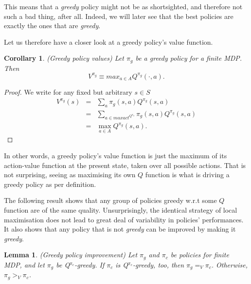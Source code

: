 \documentclass[11pt]{article} %
\newtheorem{lem}{Lemma}
\newtheorem{cor}{Corollary}
\begin{document}
This means that a \textit{greedy} policy might not be as shortsighted, and therefore not such a bad thing, after all. Indeed, we will later see that the best policies are exactly the ones that are \textit{greedy}.

Let us therefore have a closer look at a greedy policy's value function.

\begin{cor}{(Greedy policy values)}
	Let $\pi_g$ be a \textit{greedy} policy for a finite MDP. Then $$V^{\pi_g} \equiv max_{a \in A} Q^{\pi_g}(\cdot,a).$$
\end{cor}

\begin{proof}
	We write for any fixed but arbitrary $s \in S$
	\[
		\begin{array}{rll}
			V^{\pi_g}(s) 	& = 	& \sum_a \pi_g(s,a) Q^{\pi_g}(s,a) \\
						& =	& \sum_{a \in maxact^{Q^{\pi_g}}} \pi_g(s,a) Q^{\pi_g}(s,a) \\
						& = 	& \max_{a \in A} Q^{\pi_g}(s,a).
		\end{array}
	\]
\end{proof}

In other words, a greedy policy's value function is just the maximum of its action-value function at the present state, taken over all possible actions. That is not surprising, seeing as maximising its own $Q$ function is what is driving a greedy policy as per definition.

The following result shows that any group of policies greedy w.r.t some $Q$ function are of the same quality. Unsurprisingly, the identical strategy of local maximisation does not lead to great deal of variability in policies' performances. It also shows that any policy that is not \textit{greedy} can be improved by making it \textit{greedy}.

\begin{lem}{(Greedy policy improvement)}
Let $\pi_g$ and $\pi_c$  be policies for finite MDP, and let $\pi_g$ be \textit{Q}$^{\pi_c}$\textit{-greedy}. If $\pi_c$ is \textit{Q}$^{\pi_c}$\textit{-greedy}, too, then $\pi_g =_V \pi_c$. Otherwise, $\pi_g >_V \pi_c$.
\end{lem}
\end{document}
